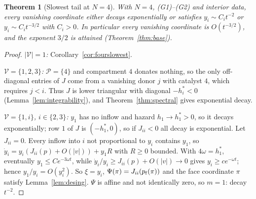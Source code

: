 \documentclass[11pt,a4paper]{article}
\newtheorem{theorem}{Theorem}[section]
\theoremstyle{definition}\newtheorem{definition}[theorem]{Definition}
\theoremstyle{remark}\newtheorem{remark}[theorem]{Remark}
\newcommand{\Vs}{\mathcal V}
\newcommand{\Ps}{\mathcal P}
\begin{document}
\begin{theorem}[Slowest tail at $N=4$]
\label{thm:four}
With $N=4$, (G1)--(G2) and interior data, every vanishing coordinate either
decays exponentially or satisfies $y_i\sim C_it^{-2}$ or $y_i\sim C_it^{-3/2}$
with $C_i>0$. In particular every vanishing coordinate is $O(t^{-3/2})$,
and the exponent $3/2$ is attained (Theorem~\ref{thm:base}).
\end{theorem}
\begin{proof}
\emph{$|\Vs|=1$:} Corollary~\ref{cor:fourslowest}.

\emph{$\Vs=\{1,2,3\}$:} $\Ps=\{4\}$ and compartment $4$ donates nothing,
so the only off-diagonal entries of $J$ come from a vanishing donor $j$
with catalyst $4$, which requires $j<i$. Thus $J$ is lower triangular with
diagonal $-h_i^*<0$ (Lemma~\ref{lem:integrability}), and
Theorem~\ref{thm:spectral} gives exponential decay.

\emph{$\Vs=\{1,i\}$, $i\in\{2,3\}$:} $y_1$ has no inflow and hazard
$h_1\to h_1^*>0$, so it decays exponentially; row $1$ of $J$ is
$(-h_1^*,0)$, so if $J_{ii}<0$ all decay is exponential. Let $J_{ii}=0$.
Every inflow into $i$ not proportional to $y_i$ contains $y_1$, so
$\dot y_i=y_i(J_{ii}(p)+O(|v|))+y_1R$ with $R\ge0$ bounded. With
$4\omega=h_1^*$, eventually $y_1\le Ce^{-3\omega t}$, while
$\dot y_i/y_i\ge J_{ii}(p)+O(|v|)\to0$ gives $y_i\ge ce^{-\omega t}$; hence
$y_1/y_i=O(y_i^2)$. So $\xi=y_i$, $\Psi(\pi)=J_{ii}(p_{\rm f}(\pi))$ and the
face coordinate $\pi$ satisfy Lemma~\ref{lem:desing}. $\Psi$ is affine
and not identically zero, so $m=1$: decay $t^{-2}$.


\end{proof}
\end{document}
